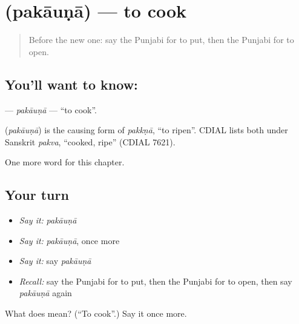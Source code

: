 \section[\texorpdfstring{\pa{ਪਕਾਉਣਾ} (pakāuṇā)}{ਪਕਾਉਣਾ (pakāuṇā)}]{ (pakāuṇā) — to cook}

\label{lesson:PA-C58-pakauna}



\begin{quote}
Before the new one: say the Punjabi for to put, then the Punjabi for to open.
\end{quote}

\subsection*{You'll want to know: }
\textbf{} — \emph{pakāuṇā} — \textquotedblleft{}to cook\textquotedblright{}.

\begin{cousinweb}
\textbf{} (\emph{pakāuṇā}) is the causing form of \emph{pakkṇā}, \textquotedblleft{}to ripen\textquotedblright{}. CDIAL lists both under Sanskrit \emph{pakva}, \textquotedblleft{}cooked, ripe\textquotedblright{} (CDIAL 7621).
\end{cousinweb}

\begin{grammarlens}[title={What you've built}]
One more word for this chapter.
\end{grammarlens}

\subsection*{Your turn}
\begin{itemize}
\raggedright
  \item \emph{Say it:} \emph{pakāuṇā}
  \item \emph{Say it:} \emph{pakāuṇā}, once more
  \item \emph{Say it:} say \emph{pakāuṇā}
  \item \emph{Recall:} say the Punjabi for to put, then the Punjabi for to open, then say \emph{pakāuṇā} again
\end{itemize}

\begin{tcolorbox}[breakable,colback=teal!4,colframe=teal!35!black,title={Before you move on}]
What does  mean? (\textquotedblleft{}To cook\textquotedblright{}.) Say it once more.
\end{tcolorbox}
